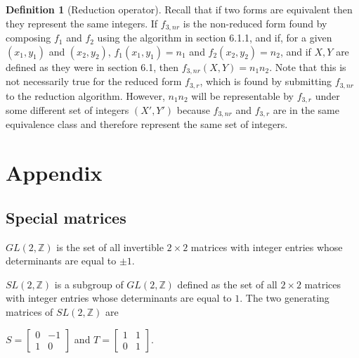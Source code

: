 \documentclass{article}
\theoremstyle{definition}
\newtheorem{definition}{Definition}[section]
\theoremstyle{theorem}
\theoremstyle{example}
\theoremstyle{corollary}
\begin{document}
\begin{definition}[Reduction operator]
\bigskip

Recall that if two forms are equivalent then they represent the same integers. If \(f_{3,nr}\) is the non-reduced form found by composing \(f_{1}\) and \(f_{2}\) using the algorithm in section 6.1.1, and if, for a given \((x_{1}, y_{1})\) and \((x_{2}, y_{2})\), \(f_{1} (x_{1}, y_{1}) = n_{1}\) and \(f_{2} (x_{2}, y_{2}) = n_{2}\), and if \(X, Y\) are defined as they were in section 6.1, then \(f_{3,nr} (X, Y) = n_{1} n_{2}\). Note that this is not necessarily true for the reduced form \(f_{3,r}\), which is found by submitting \(f_{3,nr}\) to the reduction algorithm. However, \(n_{1} n_{2}\) will be representable by \(f_{3,r}\) under some different set of integers \((X', Y')\) because \(f_{3,nr}\) and \(f_{3,r}\) are in the same equivalence class and therefore represent the same set of integers.

\bigskip






\newpage

\section{Appendix}

\bigskip

\subsection{Special matrices}

\bigskip

\(GL(2, \mathbb{Z})\) is the set of all invertible \(2 \times 2\) matrices with integer entries whose determinants are equal to \(\pm 1\).

\bigskip

\(SL(2, \mathbb{Z})\) is a subgroup of \(GL(2, \mathbb{Z})\) defined as the set of all \(2 \times 2\) matrices with integer entries whose determinants are equal to \(1\). The two generating matrices of \(SL(2, \mathbb{Z})\) are
\begin{center}
\(S = \begin{bmatrix} 0 & -1 \\ 1 & 0 \end{bmatrix}\) \quad and \quad \(T = \begin{bmatrix} 1 & 1 \\ 0 & 1 \end{bmatrix}\).
\end{center}


\end{definition}
\end{document}
